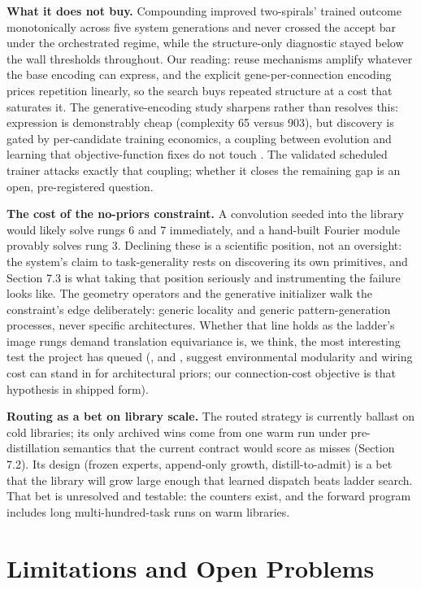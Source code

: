 \documentclass[11pt]{article}
\begin{document}
\textbf{What it does not buy.} Compounding improved two-spirals' trained outcome monotonically across five system generations and never crossed the accept bar under the orchestrated regime, while the structure-only diagnostic stayed below the wall thresholds throughout. Our reading: reuse mechanisms amplify whatever the base encoding can express, and the explicit gene-per-connection encoding prices repetition linearly, so the search buys repeated structure at a cost that saturates it. The generative-encoding study sharpens rather than resolves this: expression is demonstrably cheap (complexity 65 versus 903), but discovery is gated by per-candidate training economics, a coupling between evolution and learning that objective-function fixes do not touch \citep{hinton1987}. The validated scheduled trainer attacks exactly that coupling; whether it closes the remaining gap is an open, pre-registered question.

\textbf{The cost of the no-priors constraint.} A convolution seeded into the library would likely solve rungs 6 and 7 immediately, and a hand-built Fourier module provably solves rung 3. Declining these is a scientific position, not an oversight: the system's claim to task-generality rests on discovering its own primitives, and Section 7.3 is what taking that position seriously and instrumenting the failure looks like. The geometry operators and the generative initializer walk the constraint's edge deliberately: generic locality and generic pattern-generation processes, never specific architectures. Whether that line holds as the ladder's image rungs demand translation equivariance is, we think, the most interesting test the project has queued (\citealp{kashtan2005}, and \citealp{clune2013}, suggest environmental modularity and wiring cost can stand in for architectural priors; our connection-cost objective is that hypothesis in shipped form).

\textbf{Routing as a bet on library scale.} The routed strategy is currently ballast on cold libraries; its only archived wins come from one warm run under pre-distillation semantics that the current contract would score as misses (Section 7.2). Its design (frozen experts, append-only growth, distill-to-admit) is a bet that the library will grow large enough that learned dispatch beats ladder search. That bet is unresolved and testable: the counters exist, and the forward program includes long multi-hundred-task runs on warm libraries.

\section{Limitations and Open Problems}
\end{document}
